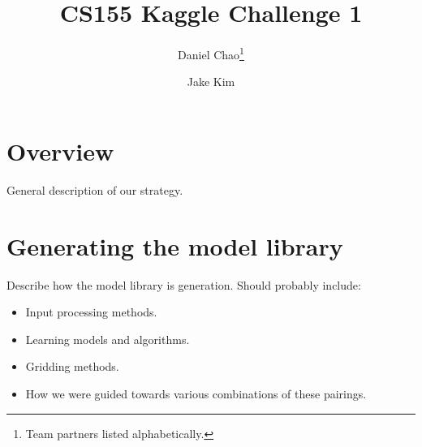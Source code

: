 \documentclass{article}
\title{CS155 Kaggle Challenge 1}
\author{Daniel Chao\thanks{Team partners listed alphabetically.} \and Jake Kim\footnotemark[1]}
\date{ }
\renewcommand{\(}{\left(}
\renewcommand{\)}{\right)}
\begin{document}
\maketitle 
\tableofcontents 

\section{Overview}
General description of our strategy. 

\section{Generating the model library}
Describe how the model library is generation. Should probably include:
\begin{itemize}
  \item Input processing methods.
  \item Learning models and algorithms. 
  \item Gridding methods.
  \item How we were guided towards various combinations of these pairings. 
\end{itemize}
\end{document}
